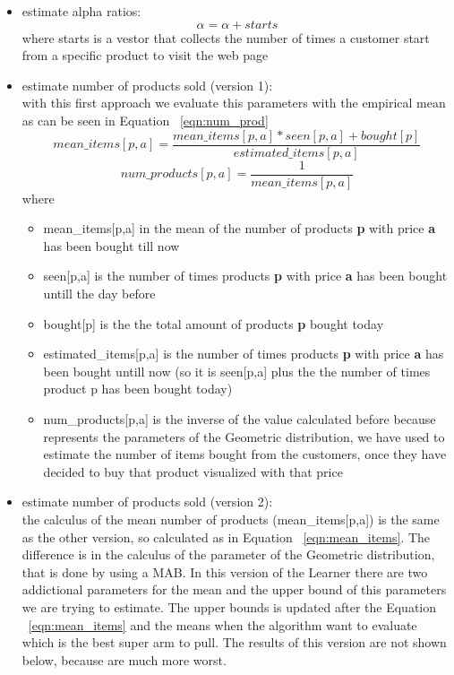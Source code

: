 \begin{itemize}
    \item estimate alpha ratios:\begin{equation}
        \alpha = \alpha + starts
    \end{equation}where starts is a vestor that collects the number of times a customer start from a specific product to visit the web page
    \item estimate number of products sold (version 1):\\
    with this first approach we evaluate this parameters with the empirical mean as can be seen in Equation ~\ref{eqn:num_prod} \begin{equation}
        \label{eqn:mean_items}
        mean\_items[p,a] = \frac{mean\_items[p,a] * seen[p,a] + bought[p]}{estimated\_items[p,a]}
    \end{equation}\begin{equation}
        \label{eqn:num_prod}
        num\_products[p,a] = \frac{1}{mean\_items[p,a]}
    \end{equation}where\begin{itemize}
        \item mean\_items[p,a] in the mean of the number of products {\bf p} with price {\bf a} has been bought till now
        \item seen[p,a] is the number of times products {\bf p} with price {\bf a} has been bought untill the day before
        \item bought[p] is the the total amount of products {\bf p} bought today
        \item estimated\_items[p,a] is the number of times products {\bf p} with price {\bf a} has been bought untill now (so it is seen[p,a] plus the the number of times product p has been bought today)
        \item num\_products[p,a] is the inverse of the value calculated before because represents the parameters of the Geometric distribution, we have used to estimate the number of items bought from the customers, once they have decided to buy that product visualized with that price
    \end{itemize}
    \item estimate number of products sold (version 2):\\
    the calculus of the mean number of products (mean\_items[p,a]) is the same as the other version, so calculated as in Equation ~\ref{eqn:mean_items}. The difference is in the calculus of the parameter of the Geometric distribution, that is done by using a MAB. In this version of the Learner there are two addictional parameters for the mean and the upper bound of this parameters we are trying to estimate. The upper bounds is updated after the Equation ~\ref{eqn:mean_items} and the means when the algorithm want to evaluate which is the best super arm to pull. The results of this version are not shown below, because are much more worst.
\end{itemize}
